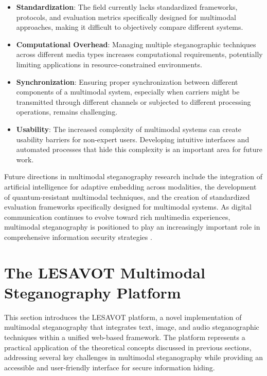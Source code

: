 \documentclass[12pt, a4paper, oneside]{book}
\begin{document}
\begin{itemize}[leftmargin=*]
    \item \textbf{Standardization}: The field currently lacks standardized frameworks, protocols, and evaluation metrics specifically designed for multimodal approaches, making it difficult to objectively compare different systems.

    \item \textbf{Computational Overhead}: Managing multiple steganographic techniques across different media types increases computational requirements, potentially limiting applications in resource-constrained environments.

    \item \textbf{Synchronization}: Ensuring proper synchronization between different components of a multimodal system, especially when carriers might be transmitted through different channels or subjected to different processing operations, remains challenging.

    \item \textbf{Usability}: The increased complexity of multimodal systems can create usability barriers for non-expert users. Developing intuitive interfaces and automated processes that hide this complexity is an important area for future work.
\end{itemize}

Future directions in multimodal steganography research include the integration of artificial intelligence for adaptive embedding across modalities, the development of quantum-resistant multimodal techniques, and the creation of standardized evaluation frameworks specifically designed for multimodal systems. As digital communication continues to evolve toward rich multimedia experiences, multimodal steganography is positioned to play an increasingly important role in comprehensive information security strategies \cite{ZhangWu2023}.

\section{The LESAVOT Multimodal Steganography Platform}
This section introduces the LESAVOT platform, a novel implementation of multimodal steganography that integrates text, image, and audio steganographic techniques within a unified web-based framework. The platform represents a practical application of the theoretical concepts discussed in previous sections, addressing several key challenges in multimodal steganography while providing an accessible and user-friendly interface for secure information hiding.
\end{document}

